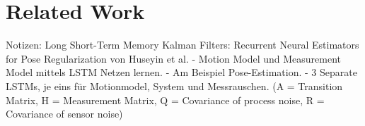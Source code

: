 \section{Related Work}

Notizen:
Long Short-Term Memory Kalman Filters: Recurrent Neural Estimators for Pose Regularization von Huseyin et al.
- Motion Model und Measurement Model mittels LSTM Netzen lernen. 
- Am Beispiel Pose-Estimation.
- 3 Separate LSTMs, je eins für Motionmodel, System und Messrauschen.
	(A = Transition Matrix, H = Measurement Matrix, Q = Covariance of process noise, R = Covariance of sensor noise)


